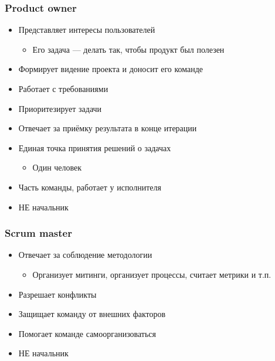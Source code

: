 \documentclass{../../slides-style}
\begin{document}
    \begin{frame}
        \frametitle{Product owner}
        \begin{itemize}
            \item Представляет интересы пользователей
            \begin{itemize}
                \item Его задача --- делать так, чтобы продукт был полезен
            \end{itemize}
            \item Формирует видение проекта и доносит его команде
            \item Работает с требованиями
            \item Приоритезирует задачи
            \item Отвечает за приёмку результата в конце итерации
            \item Единая точка принятия решений о задачах
            \begin{itemize}
                \item Один человек
            \end{itemize}
            \item Часть команды, работает у исполнителя
            \item НЕ начальник
        \end{itemize}
    \end{frame}

    \begin{frame}
        \frametitle{Scrum master}
        \begin{itemize}
            \item Отвечает за соблюдение методологии
            \begin{itemize}
                \item Организует митинги, организует процессы, считает метрики и т.п.
            \end{itemize}
            \item Разрешает конфликты
            \item Защищает команду от внешних факторов
            \item Помогает команде самоорганизоваться
            \item НЕ начальник
        \end{itemize}
    \end{frame}
\end{document}
